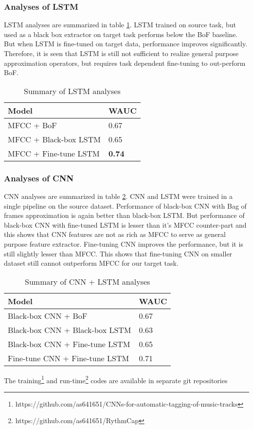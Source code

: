 \subsubsection{Analyses of LSTM}
LSTM analyses are summarized in table \ref{tab:a9}. LSTM trained on source task, but used as a black box extractor on target task performs below the BoF baseline. But when LSTM is fine-tuned on target data, performance improves significantly. Therefore, it is seen that LSTM is still not sufficient to realize general purpose approximation operators, but requires task dependent fine-tuning to out-perform BoF.   

\begin{table}[!htb]
\centering
   \begin{tabular}{ | p{} | p{} |}
    \hline
    \textbf{Model} & \textbf{WAUC} \\ \hline
    MFCC + BoF &  0.67\\ \hline
    MFCC + Black-box LSTM &  0.65 \\ \hline
    MFCC + Fine-tune LSTM  &  \textbf{0.74}\\ \hline
    \hline
    \end{tabular}
    \caption{Summary of LSTM analyses}\label{tab:a9}
\end{table}
\FloatBarrier

\subsubsection{Analyses of CNN}
CNN analyses are summarized in table \ref{tab:a10}. CNN and LSTM were trained in a single pipeline on the source dataset. Performance of black-box CNN with Bag of frames approximation is again better than black-box LSTM. But performance of black-box CNN with fine-tuned LSTM is lesser than it's MFCC counter-part and this shows that CNN features are not as rich as MFCC to serve as general purpose feature extractor. Fine-tuning CNN improves the performance, but it is still slightly lesser than MFCC. This shows that fine-tuning CNN on smaller dataset still cannot outperform MFCC for our target task.
  
\begin{table}[!htb]
\centering
   \begin{tabular}{ | p{} | p{} |}
    \hline
    \textbf{Model} & \textbf{WAUC} \\ \hline
    Black-box CNN + BoF & 0.67 \\ \hline 
    Black-box CNN + Black-box LSTM & 0.63 \\ \hline 
    Black-box CNN + Fine-tune LSTM & 0.65 \\ \hline
    Fine-tune CNN + Fine-tune LSTM &  0.71 \\ \hline
    \hline
    \end{tabular}
    \caption{Summary of CNN + LSTM analyses}\label{tab:a10}
\end{table}
\FloatBarrier
\noindent The training\footnote{https://github.com/as641651/CNNs-for-automatic-tagging-of-music-tracks} and run-time\footnote{https://github.com/as641651/RythmCap} codes are available in separate git repositories



